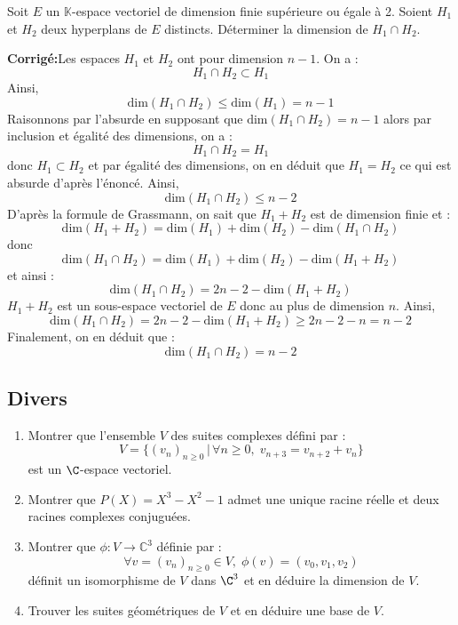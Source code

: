 \documentclass[a4paper,twoside,french,11pt]{VcCours}
\newcommand{\corr}{\textbf{Corrigé:}}
\begin{document}
\begin{Exercice}{} Soit $E$ un $\mathbb{K}$-espace vectoriel de dimension finie supérieure ou égale à 2. Soient $H_1$ et $H_2$ deux hyperplans de $E$ distincts. Déterminer la dimension de $H_1 \cap H_2$.
\end{Exercice}

\corr Les espaces $H_1$ et $H_2$ ont pour dimension $n-1$. On a :
$$ H_1 \cap H_2 \subset H_1$$
Ainsi, 
$$ \textrm{dim}(H_1 \cap H_2) \leq  \textrm{dim}(H_1) = n-1$$
Raisonnons par l'absurde en supposant que $\textrm{dim}(H_1 \cap H_2) = n-1$ alors par inclusion et égalité des dimensions, on a :
$$ H_1 \cap H_2 = H_1$$
donc $H_1 \subset H_2$ et par égalité des dimensions, on en déduit que $H_1 = H_2$ ce qui est absurde d'après l'énoncé. Ainsi,
$$  \textrm{dim}(H_1 \cap H_2) \leq n-2$$
D'après la formule de Grassmann, on sait que $H_1+H_2$ est de dimension finie et :
$$  \textrm{dim}(H_1 + H_2) =  \textrm{dim}(H_1)  +  \textrm{dim}(H_2) -  \textrm{dim}(H_1 \cap H_2) $$
donc 
$$  \textrm{dim}(H_1 \cap H_2) =  \textrm{dim}(H_1)  +  \textrm{dim}(H_2) -  \textrm{dim}(H_1 + H_2) $$
et ainsi :
$$\textrm{dim}(H_1 \cap H_2) =  2n-2 -  \textrm{dim}(H_1 + H_2) $$
$H_1+H_2$ est un sous-espace vectoriel de $E$ donc au plus de dimension $n$. Ainsi,
$$\textrm{dim}(H_1 \cap H_2) =  2n-2 -  \textrm{dim}(H_1 + H_2) \geq 2n-2-n = n-2$$
Finalement, on en déduit que :
$$ \textrm{dim}(H_1 \cap H_2) =  n-2 $$




\subsection{\large Divers}



\begin{Exercice}{} \begin{enumerate}
 \item Montrer que l'ensemble $V$ des suites complexes défini par :
 $$ V = \lbrace (v_n)_{n \geq 0} \, \vert \, \forall n \geq 0, \; v_{n+3}=v_{n+2}+v_n \rbrace$$
est un $\C$-espace vectoriel.
 \item Montrer que $P(X)=X^3-X^2-1$ admet une unique racine réelle et deux racines complexes conjuguées.
 \item Montrer que $\phi : V \rightarrow \mathbb{C}^3$ définie par :
 $$ \forall v=(v_n)_{n \geq 0} \in V, \;\phi(v)=(v_0,v_1,v_2)$$
  définit un isomorphisme de $V$ dans $\C^3$ et en déduire la dimension de $V$.
 \item Trouver les suites géométriques de $V$ et en déduire une base de $V$.
\end{enumerate}
\end{Exercice}
\end{document}
